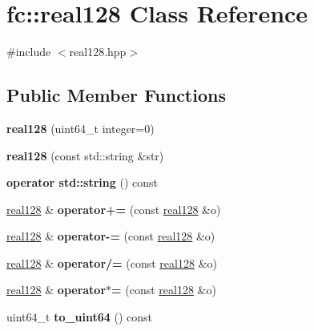 \hypertarget{classfc_1_1real128}{}\section{fc\+:\+:real128 Class Reference}
\label{classfc_1_1real128}


{\ttfamily \#include $<$real128.\+hpp$>$}

\subsection*{Public Member Functions}
\begin{DoxyCompactItemize}
\item 
\mbox{\label{classfc_1_1real128_a097da5b9bf1cf07153422781be41a16d}} 
{\bfseries real128} (uint64\+\_\+t integer=0)
\item 
\mbox{\label{classfc_1_1real128_ae105bbfed47ef87953b1e72156c4b7d7}} 
{\bfseries real128} (const std\+::string \&str)
\item 
\mbox{\label{classfc_1_1real128_a44f0f700768ba7c54874005c1a35647e}} 
{\bfseries operator std\+::string} () const
\item 
\mbox{\label{classfc_1_1real128_a3b64577b2d9b3faa2ca42c89fe06a6d6}} 
\mbox{\hyperlink{classfc_1_1real128}{real128}} \& {\bfseries operator+=} (const \mbox{\hyperlink{classfc_1_1real128}{real128}} \&o)
\item 
\mbox{\label{classfc_1_1real128_a62d973a4d6975e50aeee8d66af384bec}} 
\mbox{\hyperlink{classfc_1_1real128}{real128}} \& {\bfseries operator-\/=} (const \mbox{\hyperlink{classfc_1_1real128}{real128}} \&o)
\item 
\mbox{\label{classfc_1_1real128_a6c68340169a8a565a94aaaf7765d0263}} 
\mbox{\hyperlink{classfc_1_1real128}{real128}} \& {\bfseries operator/=} (const \mbox{\hyperlink{classfc_1_1real128}{real128}} \&o)
\item 
\mbox{\label{classfc_1_1real128_a22168634d6c0642f5298cb503d2916af}} 
\mbox{\hyperlink{classfc_1_1real128}{real128}} \& {\bfseries operator$\ast$=} (const \mbox{\hyperlink{classfc_1_1real128}{real128}} \&o)
\item 
\mbox{\label{classfc_1_1real128_acf80e4cd529988227f25e2e9f58923c0}} 
uint64\+\_\+t {\bfseries to\+\_\+uint64} () const
\end{DoxyCompactItemize}
